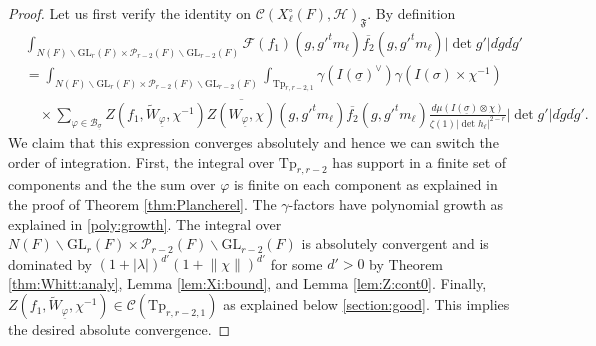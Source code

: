 \documentclass[12pt]{amsart}
\theoremstyle{remark}
\numberwithin{equation}{section}
\newcommand{\GL}{\mathrm{GL}}
\theoremstyle{definition}
\numberwithin{equation}{subsection}
\newcommand{\norm}[1]{\lVert#1\rVert}
\begin{document}
\begin{proof}
Let us first verify the identity on $\mathcal{C}(X^\circ_{\ell}(F),\mathcal{H})_{\mathfrak{F}}$. By definition
\begin{align*}
        &\int_{N(F)\backslash\GL_r(F)\times \mathcal{P}_{r-2}(F)\backslash \GL_{r-2}(F)} \mathcal{F}(f_1)(g,g'^tm_{\ell})\overline{f_2}(g,g'^tm_{\ell})|\det g'|d\dot{g}d\dot{g}'\\
        &=\int_{N(F)\backslash\GL_r(F)\times \mathcal{P}_{r-2}(F)\backslash \GL_{r-2}(F)}\int_{\mathrm{Tp}_{r,r-2,1}}\gamma(I(\underline{\sigma})^\vee)\gamma(I(\sigma) \times \chi^{-1})\\& \quad\times 
    \sum_{\varphi \in \mathcal{B}_{\underline{\sigma}}}
    Z(f_1,\widetilde{W}_{\underline{\varphi}},\chi^{-1})\overline{Z(W_{\underline{\varphi}},\chi)}(g,g'^tm_{\ell})\overline{f_2}(g,g'^tm_{\ell})\frac{d\mu(I(\underline{\sigma})\otimes \chi)}{\zeta(1)|\det h_\ell|^{2-r}}|\det g'|d\dot{g}d\dot{g}'.
\end{align*}
We claim that this expression converges absolutely and hence we can switch the order of integration.  First, the integral over $\mathrm{Tp}_{r,r-2}$ has support in a finite set of components and the the sum over $\varphi$ is finite on each component as explained in the proof of Theorem \ref{thm:Plancherel}.  The $\gamma$-factors have polynomial growth as explained in \eqref{poly:growth}.  The integral over $N(F)\backslash\GL_r(F)\times \mathcal{P}_{r-2}(F)\backslash \GL_{r-2}(F)$ is absolutely convergent and is dominated by $(1+|\lambda|)^{d'}(1+\norm{\chi})^{d'}$ for some $d'>0$ by Theorem \ref{thm:Whitt:analy}, Lemma \ref{lem:Xi:bound}, and Lemma \ref{lem:Z:cont0}.  Finally, $Z(f_1,\widetilde{W}_{\underline{\varphi}},\chi^{-1}) \in \mathcal{C}(\mathrm{Tp}_{r,r-2,1})$ as explained below \eqref{section:good}.  This implies the desired absolute convergence.


\end{proof}
\end{document}
